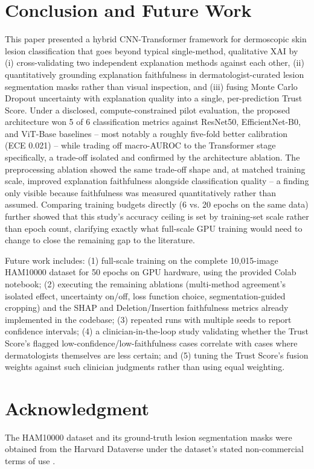 \documentclass[conference]{IEEEtran}
\begin{document}
\section{Conclusion and Future Work}

This paper presented a hybrid CNN-Transformer framework for dermoscopic skin lesion
classification that goes beyond typical single-method, qualitative XAI by (i)
cross-validating two independent explanation methods against each other, (ii)
quantitatively grounding explanation faithfulness in dermatologist-curated lesion
segmentation masks rather than visual inspection, and (iii) fusing Monte Carlo Dropout
uncertainty with explanation quality into a single, per-prediction Trust Score. Under a
disclosed, compute-constrained pilot evaluation, the proposed architecture won 5 of 6
classification metrics against ResNet50, EfficientNet-B0, and ViT-Base baselines -- most
notably a roughly five-fold better calibration (ECE 0.021) -- while trading off macro-AUROC
to the Transformer stage specifically, a trade-off isolated and confirmed by the
architecture ablation. The preprocessing ablation showed the same trade-off shape and, at
matched training scale, improved explanation faithfulness alongside classification quality
-- a finding only visible because faithfulness was measured quantitatively rather than
assumed. Comparing training budgets directly (6 vs. 20 epochs on the same data) further
showed that this study's accuracy ceiling is set by training-set scale rather than epoch
count, clarifying exactly what full-scale GPU training would need to change to close the
remaining gap to the literature.

Future work includes: (1) full-scale training on the complete 10{,}015-image HAM10000
dataset for 50 epochs on GPU hardware, using the provided Colab notebook; (2) executing the
remaining ablations (multi-method agreement's isolated effect, uncertainty on/off, loss
function choice, segmentation-guided cropping) and the SHAP and Deletion/Insertion
faithfulness metrics already implemented in the codebase; (3) repeated runs with multiple
seeds to report confidence intervals; (4) a clinician-in-the-loop study validating whether
the Trust Score's flagged low-confidence/low-faithfulness cases correlate with cases where
dermatologists themselves are less certain; and (5) tuning the Trust Score's fusion weights
against such clinician judgments rather than using equal weighting.

\section*{Acknowledgment}
The HAM10000 dataset and its ground-truth lesion segmentation masks were obtained from the
Harvard Dataverse under the dataset's stated non-commercial terms of use
\cite{tschandl2018,tschandl2020}.
\end{document}
